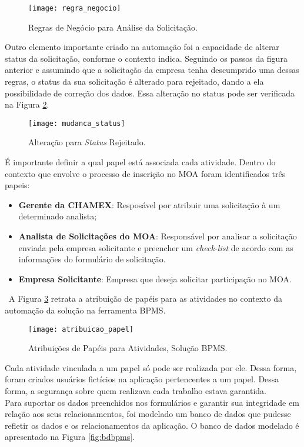 	\begin{figure}[H]
		\centering
		\texttt{[image: regra\_negocio]}
		\caption[Regras de Negócio para Análise da Solicitação]{Regras de Negócio para Análise da Solicitação.}
		\label{fig:regranegocio}
	\end{figure}
	Outro elemento importante criado na automação foi a capacidade de alterar status da solicitação, conforme o contexto indica. Seguindo os passos da figura anterior e assumindo que a solicitação da empresa tenha descumprido uma dessas regras, o status da sua solicitação é alterado para rejeitado, dando a ela possibilidade de correção dos dados. Essa alteração no status pode ser verificada na Figura \ref{fig:mudancastatus}.
	\begin{figure}[H]
		\centering
		\texttt{[image: mudanca\_status]}
		\caption[Alteração para \emph{Status} Rejeitado]{Alteração para \emph{Status} Rejeitado.}
		\label{fig:mudancastatus}
	\end{figure}
	É importante definir a qual papel está associada cada atividade. Dentro do contexto que envolve o processo de inscrição no MOA foram identificados três papeis:
	\begin{itemize}
		\item{\textbf{Gerente da CHAMEX}: Resposável por atribuir uma solicitação à um determinado analista;}
		\item{\textbf{Analista de Solicitações do MOA}: Responsável por analisar a solicitação enviada pela empresa solicitante e preencher um \emph{check-list} de acordo com as informações do formulário de solicitação.}
		\item{\textbf{Empresa Solicitante}: Empresa que deseja solicitar participação no MOA.}
	\end{itemize}
	\ \indent A Figura \ref{fig:atribuicaopapel} retrata a atribuição de papéis para as atividades no contexto da automação da solução na ferramenta BPMS.
	\begin{figure}[H]
		\centering
		\texttt{[image: atribuicao\_papel]}
		\caption[Atribuições de Papéis para Atividades, Solução BPMS]{Atribuições de Papéis para Atividades, Solução BPMS.}
		\label{fig:atribuicaopapel}
	\end{figure}
	Cada atividade vinculada a um papel só pode ser realizada por ele. Dessa forma, foram criados usuários fictícios na aplicação pertencentes a um papel. Dessa forma, a segurança sobre quem realizava cada trabalho estava garantida.
	\\ \indent Para suportar os dados preenchidos nos formulários e garantir sua integridade em relação aos seus relacionamentos, foi modelado um banco de dados que pudesse refletir os dados e os relacionamentos da aplicação. O banco de dados modelado é apresentado na Figura \ref{fig:bdbpms}.
